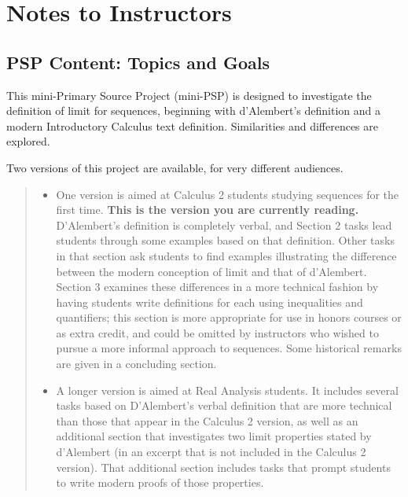 \documentclass[11pt]{article}%
\begin{document}


\newpage


\section*{Notes to Instructors}

\subsection*{PSP Content: Topics and Goals}

\vspace*{-3pt}
This mini-Primary Source Project (mini-PSP) is designed to investigate the
definition of limit for sequences, beginning with d'Alembert's definition and
a modern Introductory Calculus text definition. Similarities and differences
are explored.

Two versions of this project are available, for very different audiences.

\vspace*{-6pt}

\begin{quote}
  
\begin{itemize}
\item One version is aimed at Calculus 2 students studying sequences for the first time. \textbf{This is the version you are currently reading.}
 D'Alembert's definition is completely
verbal, and Section 2 tasks lead students through some examples based on that definition.
Other tasks in that section ask students to find examples illustrating the difference between the
modern conception of limit and that of  d'Alembert. Section 3 examines these differences  in a more technical fashion by having students write definitions for each using  inequalities and quantifiers; this section is more appropriate for use in honors courses or as extra credit, and could be omitted by instructors who wished to pursue a more informal approach to sequences. Some
historical remarks are given in a concluding section.

\item A longer version is aimed at Real Analysis students. It includes several tasks based on D'Alembert's verbal definition that are more technical than those that appear in the Calculus 2 version, as well as an additional section that investigates two limit properties
stated by d'Alembert (in an excerpt that is not included in the Calculus 2 version). That additional section includes tasks that prompt students to write modern proofs of those properties.
\end{itemize}


\end{quote}
\end{document}
